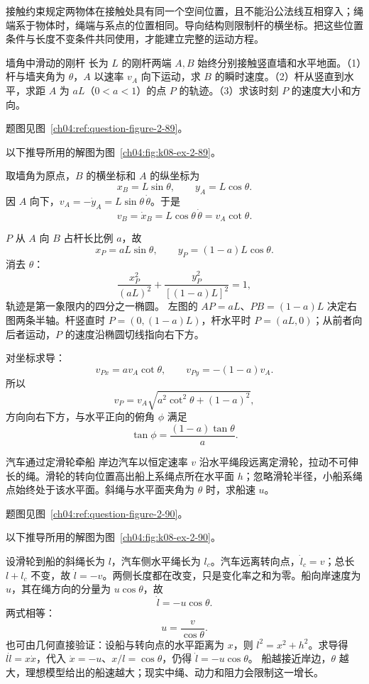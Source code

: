 {接触约束规定两物体在接触处具有同一个空间位置，且不能沿公法线互相穿入；绳端系于物体时，绳端与系点的位置相同。导向结构则限制杆的横坐标。把这些位置条件与长度不变条件共同使用，才能建立完整的运动方程。

\begin{origexamplebox}{墙角中滑动的刚杆}\label{ch04:ex:k08-2-89}
长为 $L$ 的刚杆两端 $A,B$ 始终分别接触竖直墙和水平地面。（1）杆与墙夹角为 $\theta$，$A$ 以速率 $v_A$ 向下运动，求 $B$ 的瞬时速度。（2）杆从竖直到水平，求距 $A$ 为 $aL$（$0<a<1$）的点 $P$ 的轨迹。（3）求该时刻 $P$ 的速度大小和方向。
\par 题图见图~\ref{ch04:ref:question-figure-2-89}。
\KQuestionDL
\end{origexamplebox}
\begin{xesolution}
以下推导所用的解图为图~\ref{ch04:fig:k08-ex-2-89}。

取墙角为原点，$B$ 的横坐标和 $A$ 的纵坐标为
\SlidingRodDiagram
\[
x_B=L\sin\theta,\qquad y_A=L\cos\theta.
\]
因 $A$ 向下，$v_A=-\dot y_A=L\sin\theta\,\dot\theta$。于是
\[
\boxed{v_B=\dot x_B=L\cos\theta\,\dot\theta=v_A\cot\theta}.
\]

$P$ 从 $A$ 向 $B$ 占杆长比例 $a$，故
\[
x_P=aL\sin\theta,\qquad y_P=(1-a)L\cos\theta.
\]
消去 $\theta$：
\[
\boxed{\frac{x_P^2}{(aL)^2}+\frac{y_P^2}{[(1-a)L]^2}=1},
\]
轨迹是第一象限内的四分之一椭圆。
左图的 $AP=aL$、$PB=(1-a)L$ 决定右图两条半轴。杆竖直时 $P=(0,(1-a)L)$，杆水平时 $P=(aL,0)$；从前者向后者运动，$P$ 的速度沿椭圆切线指向右下方。

对坐标求导：
\[
v_{Px}=a v_A\cot\theta,\qquad v_{Py}=-(1-a)v_A.
\]
所以
\[
\boxed{v_P=v_A\sqrt{a^2\cot^2\theta+(1-a)^2}},
\]
方向向右下方，与水平正向的俯角 $\phi$ 满足
\[
\boxed{\tan\phi=\frac{(1-a)\tan\theta}{a}}.
\]
\end{xesolution}

\begin{origexamplebox}{汽车通过定滑轮牵船}\label{ch04:ex:k08-2-90}
岸边汽车以恒定速率 $v$ 沿水平绳段远离定滑轮，拉动不可伸长的绳。滑轮的转向位置高出船上系绳点所在水平面 $h$；忽略滑轮半径，小船系绳点始终处于该水平面。斜绳与水平面夹角为 $\theta$ 时，求船速 $u$。
\par 题图见图~\ref{ch04:ref:question-figure-2-90}。
\KQuestionDM
\end{origexamplebox}
\begin{xesolution}
以下推导所用的解图为图~\ref{ch04:fig:k08-ex-2-90}。

设滑轮到船的斜绳长为 $l$，汽车侧水平绳长为 $l_c$。汽车远离转向点，$\dot l_c=v$；总长 $l+l_c$ 不变，故 $\dot l=-v$。两侧长度都在改变，只是变化率之和为零。船向岸速度为 $u$，其在绳方向的分量为 $u\cos\theta$，故
\BoatTowDiagram
\[
\dot l=-u\cos\theta.
\]
两式相等：
\[
\boxed{u=\frac{v}{\cos\theta}}.
\]
也可由几何直接验证：设船与转向点的水平距离为 $x$，则 $l^2=x^2+h^2$。求导得 $l\dot l=x\dot x$，代入 $\dot x=-u$、$x/l=\cos\theta$，仍得 $\dot l=-u\cos\theta$。
船越接近岸边，$\theta$ 越大，理想模型给出的船速越大；现实中绳、动力和阻力会限制这一增长。
\end{xesolution}


}
